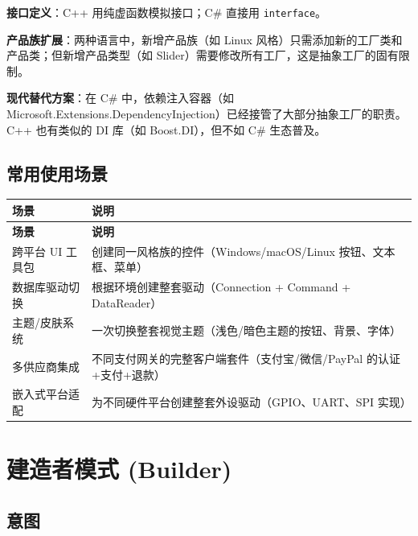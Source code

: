 \documentclass[12pt,a4paper,fontset=fandol]{ctexbook}
\begin{document}
\begin{compare}
\textbf{接口定义}：C++ 用纯虚函数模拟接口；C\# 直接用 \texttt{interface}。

\textbf{产品族扩展}：两种语言中，新增产品族（如 Linux 风格）只需添加新的工厂类和产品类；但新增产品类型（如 Slider）需要修改所有工厂，这是抽象工厂的固有限制。

\textbf{现代替代方案}：在 C\# 中，依赖注入容器（如 Microsoft.\allowbreak{}Extensions.\allowbreak{}Dependency\allowbreak{}Injection）已经接管了大部分抽象工厂的职责。C++ 也有类似的 DI 库（如 Boost.DI），但不如 C\# 生态普及。
\end{compare}

\section{常用使用场景}

\begin{longtable}{>{\raggedright\arraybackslash}p{4.5cm} >{\raggedright\arraybackslash}p{8.5cm}}
\toprule
\textbf{场景} & \textbf{说明} \\
\midrule
\endfirsthead
\toprule
\textbf{场景} & \textbf{说明} \\
\midrule
\endhead
\bottomrule
\endfoot
跨平台 UI 工具包 & 创建同一风格族的控件（Windows/\allowbreak{}\allowbreak{}macOS/\allowbreak{}\allowbreak{}Linux 按钮、文本框、菜单） \\
数据库驱动切换 & 根据环境创建整套驱动（Connection + Command + DataReader） \\
主题/皮肤系统 & 一次切换整套视觉主题（浅色/暗色主题的按钮、背景、字体） \\
多供应商集成 & 不同支付网关的完整客户端套件（支付宝/微信/PayPal 的认证+支付+退款） \\
嵌入式平台适配 & 为不同硬件平台创建整套外设驱动（GPIO、UART、SPI 实现） \\
\end{longtable}

\chapter{建造者模式 (Builder)}

\section{意图}
\end{document}
